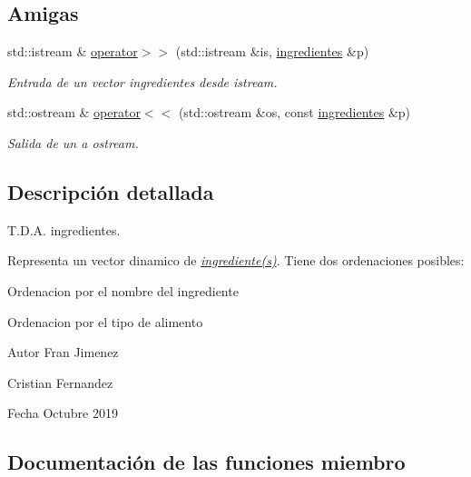 \subsection*{Amigas}
\begin{DoxyCompactItemize}
\item 
std\+::istream \& \hyperlink{classingredientes_adfbb6b2de8bd8b193715a3d58c313b84}{operator$>$$>$} (std\+::istream \&is, \hyperlink{classingredientes}{ingredientes} \&p)
\begin{DoxyCompactList}\small\item\em Entrada de un vector ingredientes desde istream. \end{DoxyCompactList}\item 
std\+::ostream \& \hyperlink{classingredientes_a47b68f377e21ce26320b8adb9c72f347}{operator$<$$<$} (std\+::ostream \&os, const \hyperlink{classingredientes}{ingredientes} \&p)
\begin{DoxyCompactList}\small\item\em Salida de un a ostream. \end{DoxyCompactList}\end{DoxyCompactItemize}


\subsection{Descripción detallada}
T.\+D.\+A. ingredientes. 

Representa un vector dinamico de {\itshape \hyperlink{classingrediente}{ingrediente(s)}}. Tiene dos ordenaciones posibles\+:


\begin{DoxyItemize}
\item Ordenacion por el nombre del ingrediente
\item Ordenacion por el tipo de alimento
\end{DoxyItemize}

\begin{DoxyAuthor}{Autor}
Fran Jimenez 

Cristian Fernandez 
\end{DoxyAuthor}
\begin{DoxyDate}{Fecha}
Octubre 2019 
\end{DoxyDate}


\subsection{Documentación de las funciones miembro}
\mbox{\label{classingredientes_a9d61c6347e216b9f99264982ad8e6074}} 
